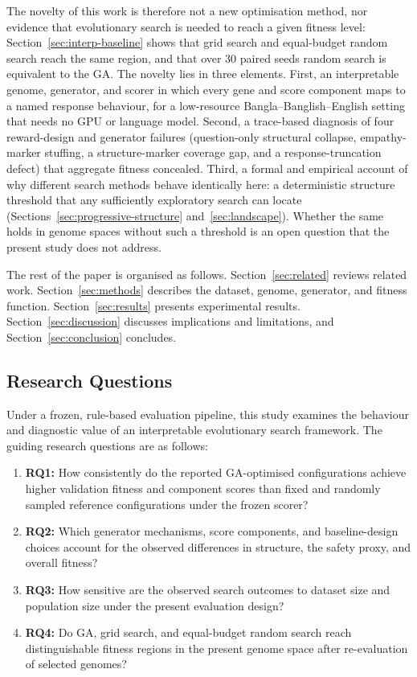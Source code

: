 \documentclass[mathematics,article,submit,xetex,moreauthors]{Definitions/mdpi}
\begin{document}
The novelty of this work is therefore not a new optimisation method, nor
evidence that evolutionary search is needed to reach a given fitness level:
Section~\ref{sec:interp-baseline} shows that grid search and equal-budget random
search reach the same region, and that over 30 paired seeds random search is
equivalent to the GA. The novelty lies in three elements. First, an
interpretable genome, generator, and scorer in which every gene and score
component maps to a named response behaviour, for a low-resource
Bangla--Banglish--English setting that needs no GPU or language model. Second, a
trace-based diagnosis of four reward-design and generator failures
(question-only structural collapse, empathy-marker stuffing, a structure-marker
coverage gap, and a response-truncation defect) that aggregate fitness
concealed. Third, a formal and empirical account of why different search methods
behave identically here: a deterministic structure threshold that any
sufficiently exploratory search can locate
(Sections~\ref{sec:progressive-structure} and~\ref{sec:landscape}). Whether the
same holds in genome spaces without such a threshold is an open question that
the present study does not address.

The rest of the paper is organised as follows.
Section~\ref{sec:related} reviews related work.
Section~\ref{sec:methods} describes the dataset, genome, generator, and fitness
function.
Section~\ref{sec:results} presents experimental results.
Section~\ref{sec:discussion} discusses implications and limitations, and
Section~\ref{sec:conclusion} concludes.


\subsection{Research Questions}

Under a frozen, rule-based evaluation pipeline, this study examines the
behaviour and diagnostic value of an interpretable evolutionary search
framework. The guiding research questions are as follows:

\begin{enumerate}
    \item \textbf{RQ1:} How consistently do the reported GA-optimised
    configurations achieve higher validation fitness and component scores than
    fixed and randomly sampled reference configurations under the frozen
    scorer?

    \item \textbf{RQ2:} Which generator mechanisms, score components, and
    baseline-design choices account for the observed differences in structure,
    the safety proxy, and overall fitness?

    \item \textbf{RQ3:} How sensitive are the observed search outcomes to
    dataset size and population size under the present evaluation design?

    \item \textbf{RQ4:} Do GA, grid search, and equal-budget random search
    reach distinguishable fitness regions in the present genome space after
    re-evaluation of selected genomes?
\end{enumerate}
\end{document}
